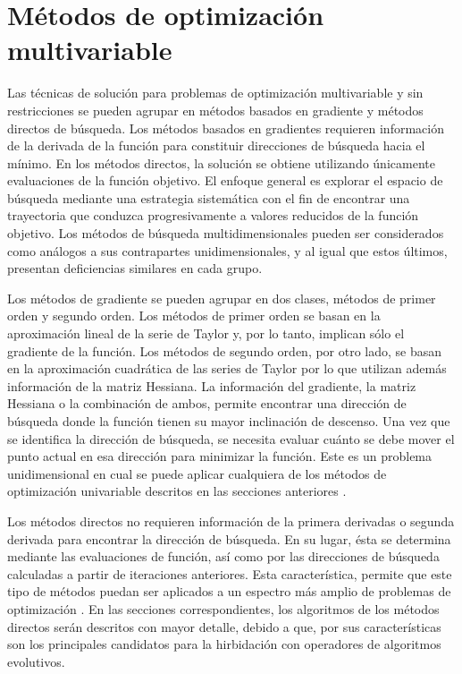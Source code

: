 \section{Métodos de optimización multivariable}

Las técnicas de solución para problemas de optimización multivariable y sin restricciones se pueden agrupar en métodos basados en gradiente y métodos directos de búsqueda. Los métodos basados en gradientes requieren información de la derivada de la función para constituir direcciones de búsqueda hacia el mínimo. En los métodos directos, la solución se obtiene utilizando únicamente evaluaciones de la función objetivo. El enfoque general es explorar el espacio de búsqueda mediante una estrategia sistemática con el fin de encontrar una trayectoria que conduzca progresivamente a valores reducidos de la función objetivo. Los métodos de búsqueda multidimensionales pueden ser considerados como análogos a sus contrapartes unidimensionales, y al igual que estos últimos, presentan deficiencias similares en cada grupo.  

Los métodos de gradiente se pueden agrupar en dos clases, métodos de primer orden y segundo orden. Los métodos de primer orden se basan en la aproximación lineal de la serie de Taylor y, por lo tanto, implican sólo el gradiente de la función. Los métodos de segundo orden, por otro lado, se basan en la aproximación cuadrática de las series de Taylor por lo que utilizan además información de la matriz Hessiana. La información del gradiente, la matriz Hessiana o la combinación de ambos, permite encontrar una dirección de búsqueda donde la función tienen su mayor inclinación de descenso. Una vez que se identifica la dirección de búsqueda, se necesita evaluar cuánto se debe mover el punto actual en esa dirección para minimizar la función. Este es un problema unidimensional en cual se puede aplicar cualquiera de los métodos de optimización univariable descritos en las secciones anteriores  \cite{luenberger_linear_2015}.

Los métodos directos no requieren información de la primera derivadas o  segunda derivada para encontrar la dirección de búsqueda. En su lugar, ésta se determina mediante las evaluaciones de función, así como por las direcciones de búsqueda calculadas a partir de iteraciones anteriores. Esta característica, permite que este tipo de métodos puedan ser aplicados a un espectro más amplio de problemas de optimización \cite{belegundu_optimization_2011}. En las secciones correspondientes, los algoritmos de los métodos directos serán descritos con mayor detalle, debido a que,  por sus características son los principales candidatos para la hirbidación con operadores de algoritmos evolutivos. 

